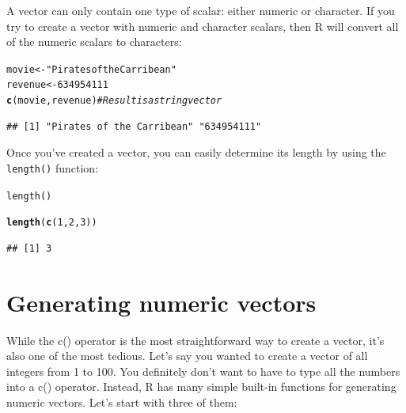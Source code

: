 \documentclass{tufte-book}\usepackage[]{graphicx}\usepackage[]{color}
\makeatletter
\newcommand{\hlnum}[1]{\textcolor[rgb]{0.686,0.059,0.569}{#1}}%
\newcommand{\hlstr}[1]{\textcolor[rgb]{0.192,0.494,0.8}{#1}}%
\newcommand{\hlcom}[1]{\textcolor[rgb]{0.678,0.584,0.686}{\textit{#1}}}%
\newcommand{\hlstd}[1]{\textcolor[rgb]{0.345,0.345,0.345}{#1}}%
\newcommand{\hlkwb}[1]{\textcolor[rgb]{0.69,0.353,0.396}{#1}}%
\newcommand{\hlkwd}[1]{\textcolor[rgb]{0.737,0.353,0.396}{\textbf{#1}}}%
\newenvironment{kframe}{%
 \def\at@end@of@kframe{}%
 \ifinner\ifhmode%
  \def\at@end@of@kframe{\end{minipage}}%
  \begin{minipage}{\columnwidth}%
 \fi\fi%
 \def\FrameCommand##1{\hskip\@totalleftmargin \hskip-\fboxsep
 \colorbox{shadecolor}{##1}\hskip-\fboxsep
     \hskip-\linewidth \hskip-\@totalleftmargin \hskip\columnwidth}%
 \MakeFramed {\advance\hsize-\width
   \@totalleftmargin\z@ \linewidth\hsize
   \@setminipage}}%
 {\par\unskip\endMakeFramed%
 \at@end@of@kframe}
\newenvironment{knitrout}{}{} %
\newcommand{\newfun}[1]{\begin{LARGE} \begin{center} \texttt{#1} \end{center} \end{LARGE}}
\makeatother
\begin{document}
A vector can only contain one type of scalar: either numeric or character. If you try to create a vector with numeric and character scalars, then R will convert all of the numeric scalars to characters:


\begin{knitrout}
\color{fgcolor}\begin{kframe}
\begin{alltt}
\hlstd{movie} \hlkwb{<-} \hlstr{"Pirates of the Carribean"}
\hlstd{revenue} \hlkwb{<-} \hlnum{634954111}
\hlkwd{c}\hlstd{(movie, revenue)} \hlcom{# Result is a string vector}
\end{alltt}
\begin{verbatim}
## [1] "Pirates of the Carribean" "634954111"
\end{verbatim}
\end{kframe}
\end{knitrout}


Once you've created a vector, you can easily determine its length by using the \texttt{length()} function:

\newfun{length()}

\begin{knitrout}
\color{fgcolor}\begin{kframe}
\begin{alltt}
\hlkwd{length}\hlstd{(}\hlkwd{c}\hlstd{(}\hlnum{1}\hlstd{,} \hlnum{2}\hlstd{,} \hlnum{3}\hlstd{))}
\end{alltt}
\begin{verbatim}
## [1] 3
\end{verbatim}
\end{kframe}
\end{knitrout}


\section{Generating numeric vectors}

While the c() operator is the most straightforward way to create a vector, it's also one of the most tedious. Let's say you wanted to create a vector of all integers from 1 to 100. You definitely don't want to have to type all the numbers into a c() operator. Instead, R has many simple built-in functions for generating numeric vectors. Let's start with three of them:
\end{document}
